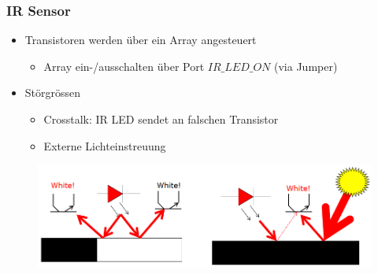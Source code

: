 \documentclass{beamer}
\begin{document}
\begin{frame}
	\frametitle{IR Sensor}
	\begin{itemize}
		\item{Transistoren werden über ein Array angesteuert}
		\begin{itemize}
			\item{Array ein-/ausschalten über Port $IR\_LED\_ON$ (via Jumper)}
		\end{itemize}
	\end{itemize}

	\begin{itemize}	
		\item{Störgrössen}
		\begin{itemize}
			\item{Crosstalk: IR LED sendet an falschen Transistor}
			\item{Externe Lichteinstreuung}
		\end{itemize}
	\end{itemize}

	\begin{figure}[h!]
		\centering
		\includegraphics[width=0.6\linewidth]{figure/linefollowing_disturbance.PNG}
	\end{figure}
\end{frame}


\end{document}
